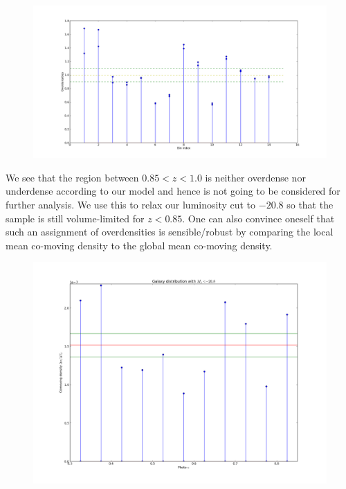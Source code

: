 \documentclass[twocolumn,useAMS,usenatbib]{mn2e}
\begin{document}
\begin{figure}
 \centering
 \includegraphics[width=\columnwidth]{Figures/fig4}
 \label{fig:fig4}
 \caption{}
\end{figure}

We see that the region between $0.85<z<1.0$ is neither overdense nor underdense according to our model and hence is not going to be considered for further analysis.
We use this to relax our luminosity cut to $-20.8$ so that the sample is still volume-limited for $z<0.85$. One can also convince oneself that such an assignment of overdensities
is sensible/robust by comparing the local mean co-moving density to the global mean co-moving density.

\begin{figure}
 \centering
 \includegraphics[width=\columnwidth]{../plots_20140219/comoving_densities(2b).png}
 \label{fig:comoving_densities}
 \caption{}
\end{figure}
\end{document}

